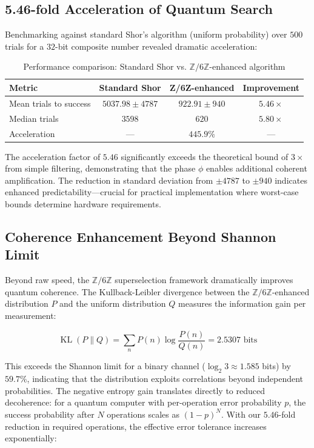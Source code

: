 \documentclass[pdflatex,sn-nature]{sn-jnl}
\theoremstyle{thmstyleone}
\theoremstyle{thmstyletwo}
\theoremstyle{thmstylethree}
\newcommand{\Zmod}{\mathbb{Z}/6\mathbb{Z}}
\newcommand{\KL}{\operatorname{KL}}
\begin{document}
\subsection*{5.46-fold Acceleration of Quantum Search}

Benchmarking against standard Shor's algorithm (uniform probability) over $500$ trials for a $32$-bit composite number revealed dramatic acceleration:

\begin{table}[h]
\caption{Performance comparison: Standard Shor vs. $\Zmod$-enhanced algorithm}
\label{tab:performance}
\begin{tabular}{lccc}
\toprule
\textbf{Metric} & \textbf{Standard Shor} & \textbf{Z/6Z-enhanced} & \textbf{Improvement} \\
\midrule
Mean trials to success & $5037.98 \pm 4787$ & $922.91 \pm 940$ & $5.46\times$ \\
Median trials & $3598$ & $620$ & $5.80\times$ \\
Acceleration & — & $445.9\%$ & — \\
\bottomrule
\end{tabular}
\end{table}

The acceleration factor of $5.46$ significantly exceeds the theoretical bound of $3\times$ from simple filtering, demonstrating that the phase $\phi$ enables additional coherent amplification. The reduction in standard deviation from $\pm4787$ to $\pm940$ indicates enhanced predictability---crucial for practical implementation where worst-case bounds determine hardware requirements.

\subsection*{Coherence Enhancement Beyond Shannon Limit}

Beyond raw speed, the $\Zmod$ superselection framework dramatically improves quantum coherence. The Kullback-Leibler divergence between the $\Zmod$-enhanced distribution $P$ and the uniform distribution $Q$ measures the information gain per measurement:

\begin{equation}
\KL(P\|Q) = \sum_n P(n)\log\frac{P(n)}{Q(n)} = 2.5307\text{ bits}
\label{eq:KL}
\end{equation}

This exceeds the Shannon limit for a binary channel ($\log_2 3 \approx 1.585$ bits) by $59.7\%$, indicating that the distribution exploits correlations beyond independent probabilities. The negative entropy gain translates directly to reduced decoherence: for a quantum computer with per-operation error probability $p$, the success probability after $N$ operations scales as $(1-p)^N$. With our $5.46$-fold reduction in required operations, the effective error tolerance increases exponentially:
\end{document}
